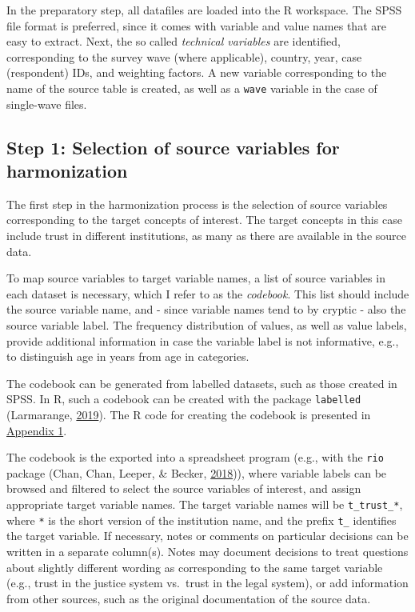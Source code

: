 \documentclass[12pt,]{article}
\begin{document}
In the preparatory step, all datafiles are loaded into the R workspace. The SPSS file format is preferred, since it comes with variable and value names that are easy to extract. Next, the so called \emph{technical variables} are identified, corresponding to the survey wave (where applicable), country, year, case (respondent) IDs, and weighting factors. A new variable corresponding to the name of the source table is created, as well as a \texttt{wave} variable in the case of single-wave files.

\hypertarget{step-1-selection-of-source-variables-for-harmonization}{%
\subsection{Step 1: Selection of source variables for harmonization}\label{step-1-selection-of-source-variables-for-harmonization}}

The first step in the harmonization process is the selection of source variables corresponding to the target concepts of interest. The target concepts in this case include trust in different institutions, as many as there are available in the source data.

To map source variables to target variable names, a list of source variables in each dataset is necessary, which I refer to as the \emph{codebook}. This list should include the source variable name, and - since variable names tend to by cryptic - also the source variable label. The frequency distribution of values, as well as value labels, provide additional information in case the variable label is not informative, e.g., to distinguish age in years from age in categories.

The codebook can be generated from labelled datasets, such as those created in SPSS. In R, such a codebook can be created with the package \texttt{labelled} (Larmarange, \protect\hyperlink{ref-labelled}{2019}). The R code for creating the codebook is presented in \protect\hyperlink{appendix1}{Appendix 1}.

The codebook is the exported into a spreadsheet program (e.g., with the \texttt{rio} package (Chan, Chan, Leeper, \& Becker, \protect\hyperlink{ref-rio}{2018})), where variable labels can be browsed and filtered to select the source variables of interest, and assign appropriate target variable names. The target variable names will be \texttt{t\_trust\_*}, where \texttt{*} is the short version of the institution name, and the prefix \texttt{t\_} identifies the target variable. If necessary, notes or comments on particular decisions can be written in a separate column(s). Notes may document decisions to treat questions about slightly different wording as corresponding to the same target variable (e.g., trust in the justice system vs.~trust in the legal system), or add information from other sources, such as the original documentation of the source data.
\end{document}
